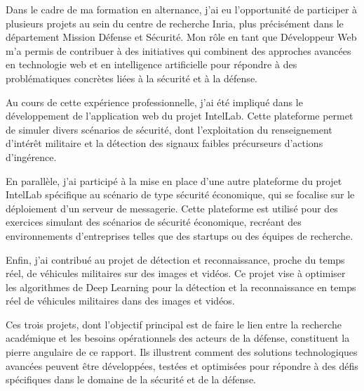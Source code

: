 %
%
\sloppy

Dans le cadre de ma formation en alternance, j'ai eu l'opportunité de participer à plusieurs projets au sein du centre de recherche Inria, plus précisément dans le département Mission Défense et Sécurité. Mon rôle en tant que Développeur Web m'a permis de contribuer à des initiatives qui combinent des approches avancées en technologie web et en intelligence artificielle pour répondre à des problématiques concrètes liées à la sécurité et à la défense.

Au cours de cette expérience professionnelle, j'ai été impliqué dans le développement de l'application web du projet IntelLab. Cette plateforme permet de simuler divers scénarios de sécurité, dont l'exploitation du renseignement d'intérêt militaire et la détection des signaux faibles précurseurs d'actions d'ingérence.

En parallèle, j'ai participé à la mise en place d'une autre plateforme du projet IntelLab spécifique au scénario de type sécurité économique, qui se focalise sur le déploiement d'un serveur de messagerie. Cette plateforme est utilisé pour des exercices simulant des scénarios de sécurité économique, recréant des environnements d'entreprises telles que des startups ou des équipes de recherche.

Enfin, j'ai contribué au projet de détection et reconnaissance, proche du temps réel, de véhicules militaires sur des images et vidéos. Ce projet vise à optimiser les algorithmes de Deep Learning pour la détection et la reconnaissance en temps réel de véhicules militaires dans des images et vidéos.

Ces trois projets, dont l'objectif principal est de faire le lien entre la recherche académique et les besoins opérationnels des acteurs de la défense, constituent la pierre angulaire de ce rapport. Ils illustrent comment des solutions technologiques avancées peuvent être développées, testées et optimisées pour répondre à des défis spécifiques dans le domaine de la sécurité et de la défense.


